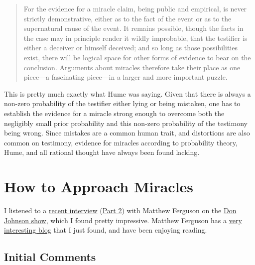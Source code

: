 \begin{quote}
For the evidence for a miracle claim, being public and empirical, is
never strictly demonstrative, either as to the fact of the event or as
to the supernatural cause of the event. It remains possible, though the
facts in the case may in principle render it wildly improbable, that the
testifier is either a deceiver or himself deceived; and so long as those
possibilities exist, there will be logical space for other forms of
evidence to bear on the conclusion. Arguments about miracles therefore
take their place as one piece---a fascinating piece---in a larger and
more important puzzle.
\end{quote}

This is pretty much exactly what Hume was saying. Given that there is
always a non-zero probability of the testifier either lying or being
mistaken, one has to establish the evidence for a miracle strong enough
to overcome both the negligibly small prior probability and this
non-zero probability of the testimony being wrong. Since mistakes are a
common human trait, and distortions are also common on testimony,
evidence for miracles according to probability theory, Hume, and all
rational thought have always been found lacking.






\section{How to Approach Miracles}

I listened to a
\href{http://donjohnsonministries.org/discussion-with-naturalist-matthew-ferguson-part-1/}{recent
interview}
(\href{http://donjohnsonministries.org/discussion-with-naturalist-matthew-ferguson-part-2/)}{Part
2}) with Matthew Ferguson on the
\href{http://donjohnsonministries.org/}{Don Johnson show}, which I found
pretty impressive. Matthew Ferguson has a
\href{http://adversusapologetica.wordpress.com/}{very interesting blog}
that I just found, and have been enjoying reading.

\subsection{Initial Comments}\label{pandoc-initial-comments}

